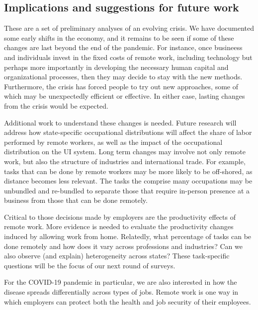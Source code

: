 \documentclass[12pt]{article}
\begin{document}



\subsection{Implications and suggestions for future work}
These are a set of preliminary analyses of an evolving crisis. We have documented some early shifts in the economy, and it remains to be seen if some of these changes are last beyond the end of the pandemic. For instance, once busineess and individuals invest in the fixed costs of remote work, including technology but perhaps more importantly in developing the necessary human capital and organizational processes, then they may decide to stay with the new methods.  Furthermore, the crisis has forced people to try out new approaches, some of which may be unexpectedly efficient or effective.  In either case, lasting changes from the crisis would be expected.  

Additional work to understand these changes is needed. Future research will address how state-specific occupational distributions will affect the share of labor performed by remote workers, as well as the impact of the occupational distribution on the UI system.  Long term changes may involve not only remote work, but also  the structure of industries and international trade. For example, tasks that can be done by remote workers may be more likely to be off-shored, as distance becomes less relevant. The tasks the comprise many occupations may be unbundled and re-bundled to separate those that require in-person presence at a business from those that can be done remotely.

Critical to those decisions made by employers are the productivity effects of remote work. More evidence is needed to evaluate the productivity changes induced by allowing work from home. Relatedly, what percentage of tasks can be done remotely and how does it vary across professions and industries? Can we also observe (and explain) heterogeneity across states? These task-specific questions will be the focus of our next round of surveys.

For the COVID-19 pandemic in particular, we are also interested in how the disease spreads differentially across types of jobs. Remote work is one way in which employers can protect both the health and job security of their employees.
\end{document}
